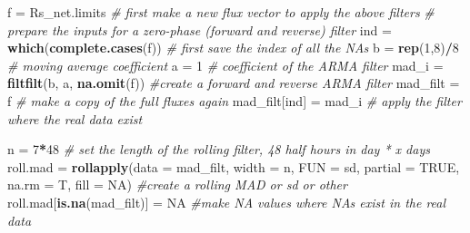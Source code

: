 \documentclass[
]{article}
\newenvironment{Shaded}{\begin{snugshade}}{\end{snugshade}}
\newcommand{\AttributeTok}[1]{\textcolor[rgb]{0.13,0.29,0.53}{#1}}
\newcommand{\CommentTok}[1]{\textcolor[rgb]{0.56,0.35,0.01}{\textit{#1}}}
\newcommand{\ConstantTok}[1]{\textcolor[rgb]{0.56,0.35,0.01}{#1}}
\newcommand{\DecValTok}[1]{\textcolor[rgb]{0.00,0.00,0.81}{#1}}
\newcommand{\FunctionTok}[1]{\textcolor[rgb]{0.13,0.29,0.53}{\textbf{#1}}}
\newcommand{\NormalTok}[1]{#1}
\newcommand{\OtherTok}[1]{\textcolor[rgb]{0.56,0.35,0.01}{#1}}
\newcommand{\SpecialCharTok}[1]{\textcolor[rgb]{0.81,0.36,0.00}{\textbf{#1}}}
\begin{document}
\begin{Shaded}
\begin{Highlighting}[]
\NormalTok{f }\OtherTok{=}\NormalTok{ Rs\_net.limits }\CommentTok{\# first make a new flux vector to apply the above filters}
\CommentTok{\# prepare the inputs for a zero{-}phase (forward and reverse) filter  }
\NormalTok{ind       }\OtherTok{=} \FunctionTok{which}\NormalTok{(}\FunctionTok{complete.cases}\NormalTok{(f))   }\CommentTok{\# first save the index of all the NAs}
\NormalTok{b         }\OtherTok{=} \FunctionTok{rep}\NormalTok{(}\DecValTok{1}\NormalTok{,}\DecValTok{8}\NormalTok{)}\SpecialCharTok{/}\DecValTok{8}                 \CommentTok{\# moving average coefficient}
\NormalTok{a         }\OtherTok{=} \DecValTok{1}                          \CommentTok{\# coefficient of the ARMA filter}
\NormalTok{mad\_i    }\OtherTok{=} \FunctionTok{filtfilt}\NormalTok{(b, a, }\FunctionTok{na.omit}\NormalTok{(f)) }\CommentTok{\#create a forward and reverse ARMA filter}
\NormalTok{mad\_filt }\OtherTok{=}\NormalTok{ f                          }\CommentTok{\# make a copy of the full fluxes again}
\NormalTok{mad\_filt[ind] }\OtherTok{=}\NormalTok{ mad\_i                }\CommentTok{\# apply the filter where the real data exist}

\NormalTok{n }\OtherTok{=} \DecValTok{7}\SpecialCharTok{*}\DecValTok{48} \CommentTok{\# set the length of the rolling filter, 48 half hours in day * x days}
\NormalTok{roll.mad }\OtherTok{=} \FunctionTok{rollapply}\NormalTok{(}\AttributeTok{data =}\NormalTok{ mad\_filt,}
                     \AttributeTok{width =}\NormalTok{ n,}
                     \AttributeTok{FUN =}\NormalTok{ sd,}
                     \AttributeTok{partial =} \ConstantTok{TRUE}\NormalTok{,}
                     \AttributeTok{na.rm =}\NormalTok{ T,}
                     \AttributeTok{fill =} \ConstantTok{NA}\NormalTok{)  }\CommentTok{\#create a rolling MAD or sd or other}
\NormalTok{roll.mad[}\FunctionTok{is.na}\NormalTok{(mad\_filt)] }\OtherTok{=} \ConstantTok{NA}  \CommentTok{\#make NA values where NAs exist in the real data}


\end{Highlighting}
\end{Shaded}
\end{document}
